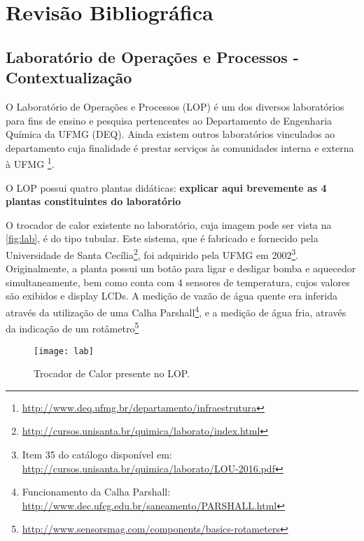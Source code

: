\chapter{Revisão Bibliográfica}
	
	\section{Laboratório de Operações e Processos - Contextualização}
		O Laboratório de Operações e Processos (LOP) é um dos diversos laboratórios para fins de ensino e pesquisa pertencentes ao Departamento de Engenharia Química da UFMG (DEQ). Ainda existem outros laboratórios vinculados ao departamento cuja finalidade é prestar serviços às comunidades interna e externa à UFMG \footnote{\url{http://www.deq.ufmg.br/departamento/infraestrutura}}.
		
		O LOP possui quatro plantas didáticas: \textbf{explicar aqui brevemente as 4 plantas constituintes do laboratório}
		
		O trocador de calor existente no laboratório, cuja imagem pode ser vista na \autoref{fig:lab}, é do tipo tubular. Este sistema, que é fabricado e fornecido pela Universidade de Santa Cecília\footnote{\url{http://cursos.unisanta.br/quimica/laborato/index.html}}, foi adquirido pela UFMG em 2002\footnote{Item 35 do catálogo disponível em: \url{http://cursos.unisanta.br/quimica/laborato/LOU-2016.pdf}}. Originalmente, a planta possui um botão para ligar e desligar bomba e aquecedor simultaneamente, bem como conta com 4 sensores de temperatura, cujos valores são exibidos e display LCDs. A medição de vazão de água quente era inferida através da utilização de uma Calha Parshall\footnote{Funcionamento da Calha Parshall: \url{http://www.dec.ufcg.edu.br/saneamento/PARSHALL.html}}, e a medição de água fria, através da indicação de um rotâmetro\footnote{\url{http://www.sensorsmag.com/components/basics-rotameters}}
		
		\begin{figure}[!htb]
			\centering
			\texttt{[image: lab]}  %
			\caption{Trocador de Calor presente no LOP.}
			\label{fig:lab}
		\end{figure}

